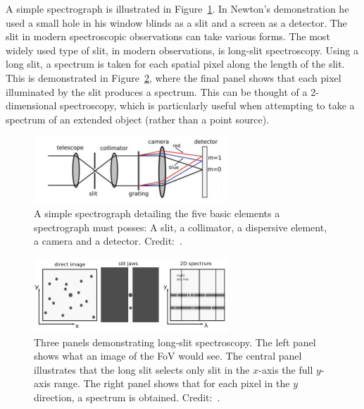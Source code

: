 A simple spectrograph is illustrated in Figure~\ref{fig:spectrograph}.
In Newton's demonstration he used a small hole in his window blinds as a slit and a screen as a detector.
The slit in modern spectroscopic observations can take various forms.
The most widely used type of slit, in modern observations, is long-slit spectroscopy.
Using a long slit, a spectrum is taken for each spatial pixel along the length of the slit.
This is demonstrated in Figure~\ref{fig:long-slit}, where the final panel shows that each pixel illuminated by the slit produces a spectrum.
This can be thought of a 2-dimensional spectroscopy, which is particularly useful when attempting to take a spectrum of an extended object
(rather than a point source).

\begin{figure}
 \centering
 \includegraphics[width=0.65\textwidth]{kmos/Lawrence-spectrograph}
 \caption[Simple Spectrograph]{A simple spectrograph detailing the five basic elements a spectrograph must posses: A slit, a collimator, a dispersive element, a camera and a detector.
 Credit:~\cite{2014amcg.book.....L}.
 \label{fig:spectrograph}}
\end{figure}

\begin{figure}
 \centering
 \includegraphics[width=0.65\textwidth]{kmos/Lawrence-long-slit}
 \caption[Long-slit Spectroscopy]{Three panels demonstrating long-slit spectroscopy.
 The left panel shows what an image of the FoV would see.
 The central panel illustrates that the long slit selects only slit in the $x$-axis the full $y$-axis range.
 The right panel shows that for each pixel in the $y$ direction, a spectrum is obtained.
 Credit:~\cite{2014amcg.book.....L}.
 \label{fig:long-slit}}
\end{figure}

